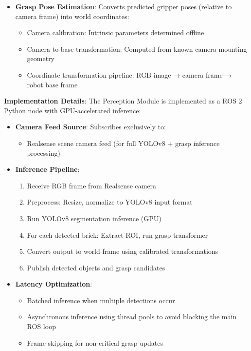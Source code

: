 \begin{itemize}
    The output is a grasping point with the highest confidence.
    \item \textbf{Grasp Pose Estimation}: Converts predicted gripper poses (relative to camera frame) into world coordinates:
    \begin{itemize}
        \item Camera calibration: Intrinsic parameters determined offline
        \item Camera-to-base transformation: Computed from known camera mounting geometry
        \item Coordinate transformation pipeline: RGB image → camera frame → robot base frame
    \end{itemize}
   
\end{itemize}

\textbf{Implementation Details}:
The Perception Module is implemented as a ROS 2 Python node with GPU-accelerated inference:

\begin{itemize}
    \item \textbf{Camera Feed Source}: Subscribes exclusively to:
    \begin{itemize}
        \item Realsense scene camera feed (for full YOLOv8 + grasp inference processing)
    \end{itemize}
        
    \item \textbf{Inference Pipeline}: 
    \begin{enumerate}
        \item Receive RGB frame from Realsense camera
        \item Preprocess: Resize, normalize to YOLOv8 input format
        \item Run YOLOv8 segmentation inference (GPU)
        \item For each detected brick: Extract ROI, run grasp transformer
        \item Convert output to world frame using calibrated transformations
        \item Publish detected objects and grasp candidates
    \end{enumerate}
    
    \item \textbf{Latency Optimization}: 
    \begin{itemize}
        \item Batched inference when multiple detections occur
        \item Asynchronous inference using thread pools to avoid blocking the main ROS loop
        \item Frame skipping for non-critical grasp updates
    \end{itemize}

\end{itemize}

